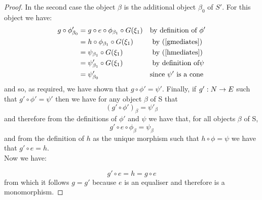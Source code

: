 \documentclass[10pt,a4paper]{scrartcl}
\begin{document}
\begin{proof}
\noindent
In the second case the object $\beta$ is the additional object $\beta_0$ of $S'$. For this object we have:
\begin{align*}
g \circ \phi'_{\beta_0}
   & = g \circ e \circ \phi_{\beta_1} \circ G(\xi_1)  && \mbox{by definition of }\phi' \\ 
             & = h \circ \phi_{\beta_1} \circ G(\xi_1) && \mbox{ by (\ref{gmediates})} \\
             & = \psi_{\beta_1}  \circ G(\xi_1)       && \mbox{ by (\ref{hmediates})} \\
						 & = \psi'_{\beta_1} \circ G(\xi_1)       && \mbox{ by definition of} \psi \\
						& = \psi'_{\beta_0}                        && \mbox{since }\psi' \mbox{ is a cone} \\ 
\end{align*}
and so, as required, we have shown that 
$g \circ \phi' = \psi'$.
\noindent Finally, if $g':N \rightarrow E$ such that $g' \circ \phi' = \psi'$ then we have 
for any object $\beta$ of S that
$$(g'\circ\phi')_\beta = \psi'_\beta$$
\noindent
and therefore from the definitions of $\phi'$ and $\psi$ we have
that, for all objects $\beta$ of S,
$$
g' \circ e \circ \phi_\beta = \psi_\beta
$$
\noindent
and  from the definition of $h$ as the unique morphism such that
$h \circ \phi = \psi$ we have that 
$g' \circ e = h$.\\

\noindent
Now we have:
 
$$g' \circ e = h = g \circ e$$
from which it follows $g=g'$ because $e$ is an equaliser and therefore is a monomorphism. 
\end{proof}
\fi


\end{document}
